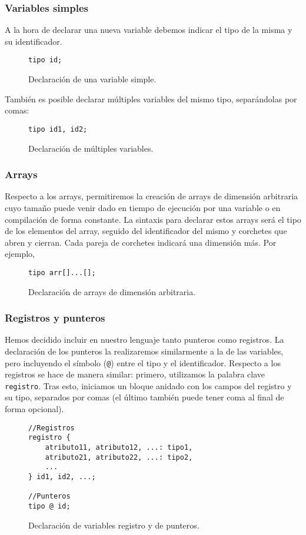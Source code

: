 \subsubsection*{Variables simples}
A la hora de declarar una nueva variable debemos indicar el tipo de la misma y
su identificador.
\begin{figure}[H]
    \centering
    \begin{lstlisting}
tipo id;
    \end{lstlisting}
    \caption{Declaración de una variable simple.}
\end{figure}
También es posible declarar múltiples variables del mismo tipo, separándolas por
comas:
\begin{figure}[H]
    \centering
    \begin{lstlisting}
tipo id1, id2;
    \end{lstlisting}
    \caption{Declaración de múltiples variables.}
\end{figure}


\subsubsection*{Arrays}
Respecto a los arrays, permitiremos la creación de arrays de dimensión
arbitraria cuyo tamaño puede venir dado en tiempo de ejecución por una variable
o en compilación de forma constante. La sintaxis para declarar estos arrays será
el tipo de los elementos del array, seguido del identificador del mismo y
corchetes que abren y cierran. Cada pareja de corchetes indicará una dimensión
más. Por ejemplo,
\begin{figure}[H]
    \centering
    \begin{lstlisting}
tipo arr[]...[];
    \end{lstlisting}
    \caption{Declaración de arrays de dimensión arbitraria.}
\end{figure}

\subsubsection*{Registros y punteros}
Hemos decidido incluir en nuestro lenguaje tanto punteros como registros. La
declaración de los punteros la realizaremos similarmente a la de las variables,
pero incluyendo el símbolo (\lstinline{@}) entre el tipo y el identificador. Respecto a los
registros se hace de manera similar: primero, utilizamos la palabra clave \lstinline{registro}. Tras esto, iniciamos un bloque anidado
con los campos del registro y su tipo, separados por comas (el último también
puede tener coma al final de forma opcional).
\begin{figure}[H]
    \centering
    \begin{lstlisting}
//Registros
registro {
    atributo11, atributo12, ...: tipo1,
    atributo21, atributo22, ...: tipo2,
    ...
} id1, id2, ...;

//Punteros
tipo @ id;
    \end{lstlisting}
    \caption{Declaración de variables registro y de punteros.}
\end{figure}

